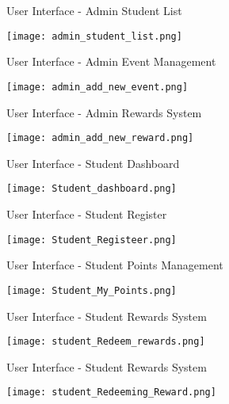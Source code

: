 \documentclass{beamer}
\begin{document}
\begin{frame}{User Interface - Admin Student List}
  \begin{center}
    \texttt{[image: admin\_student\_list.png]}
  \end{center}
\end{frame}

\begin{frame}{User Interface - Admin Event Management}
  \begin{center}
    \texttt{[image: admin\_add\_new\_event.png]}
  \end{center}
\end{frame}

\begin{frame}{User Interface - Admin Rewards System}
  \begin{center}
    \texttt{[image: admin\_add\_new\_reward.png]}
  \end{center}
\end{frame}

\begin{frame}{User Interface - Student Dashboard}
  \begin{center}
    \texttt{[image: Student\_dashboard.png]}
  \end{center}
\end{frame}

\begin{frame}{User Interface - Student Register}
  \begin{center}
    \texttt{[image: Student\_Registeer.png]}
  \end{center}
\end{frame}

\begin{frame}{User Interface - Student Points Management}
  \begin{center}
    \texttt{[image: Student\_My\_Points.png]}
  \end{center}
\end{frame}

\begin{frame}{User Interface - Student Rewards System}
  \begin{center}
    \texttt{[image: student\_Redeem\_rewards.png]}
  \end{center}
\end{frame}

\begin{frame}{User Interface - Student Rewards System}
  \begin{center}
    \texttt{[image: student\_Redeeming\_Reward.png]}
  \end{center}
\end{frame}
\end{document}
